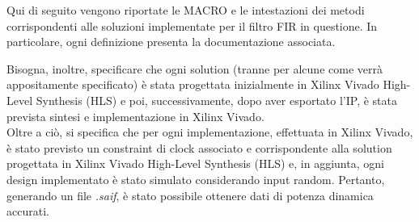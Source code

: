 Qui di seguito vengono riportate le MACRO e le intestazioni dei metodi corrispondenti alle soluzioni implementate per il filtro FIR in questione. In particolare, ogni definizione presenta la documentazione associata.

Bisogna, inoltre, specificare che ogni solution (tranne per alcune come verrà appositamente specificato) è stata progettata inizialmente in Xilinx\textsuperscript{\textregistered} Vivado\textsuperscript{\textregistered} High-Level Synthesis (HLS) e poi, successivamente, dopo aver esportato l'IP, è stata prevista sintesi e implementazione in Xilinx\textsuperscript{\textregistered} Vivado\textsuperscript{\textregistered}. 
\\
Oltre a ciò, si specifica che per ogni implementazione, effettuata in Xilinx\textsuperscript{\textregistered} Vivado\textsuperscript{\textregistered}, è stato previsto un constraint di clock associato e corrispondente alla solution progettata in Xilinx\textsuperscript{\textregistered} Vivado\textsuperscript{\textregistered} High-Level Synthesis (HLS) e, in aggiunta, ogni design implementato è stato simulato considerando input random. Pertanto, generando un file \textit{.saif}, è stato possibile ottenere dati di potenza dinamica accurati.
